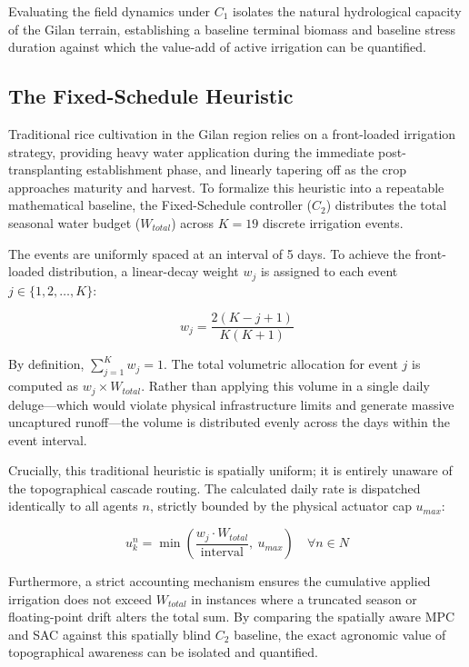 \documentclass[11pt, a4paper]{article}
\begin{document}
Evaluating the field dynamics under $C_1$ isolates the natural hydrological capacity of the Gilan terrain, establishing a baseline terminal biomass and baseline stress duration against which the value-add of active irrigation can be quantified.

\subsection{The Fixed-Schedule Heuristic}

Traditional rice cultivation in the Gilan region relies on a front-loaded irrigation strategy, providing heavy water application during the immediate post-transplanting establishment phase, and linearly tapering off as the crop approaches maturity and harvest. To formalize this heuristic into a repeatable mathematical baseline, the Fixed-Schedule controller ($C_2$) distributes the total seasonal water budget ($W_{total}$) across $K = 19$ discrete irrigation events.

The events are uniformly spaced at an interval of 5 days. To achieve the front-loaded distribution, a linear-decay weight $w_j$ is assigned to each event $j \in \{1, 2, \dots, K\}$:

\begin{equation}
    w_j = \frac{2(K - j + 1)}{K(K+1)}
\end{equation}

By definition, $\sum_{j=1}^{K} w_j = 1$. The total volumetric allocation for event $j$ is computed as $w_j \times W_{total}$. Rather than applying this volume in a single daily deluge---which would violate physical infrastructure limits and generate massive uncaptured runoff---the volume is distributed evenly across the days within the event interval. 

Crucially, this traditional heuristic is spatially uniform; it is entirely unaware of the topographical cascade routing. The calculated daily rate is dispatched identically to all agents $n$, strictly bounded by the physical actuator cap $u_{max}$:

\begin{equation}
    u^n_k = \min \left( \frac{w_j \cdot W_{total}}{\text{interval}}, \ u_{max} \right) \quad \forall n \in N
\end{equation}

Furthermore, a strict accounting mechanism ensures the cumulative applied irrigation does not exceed $W_{total}$ in instances where a truncated season or floating-point drift alters the total sum. By comparing the spatially aware MPC and SAC against this spatially blind $C_2$ baseline, the exact agronomic value of topographical awareness can be isolated and quantified.
\end{document}
